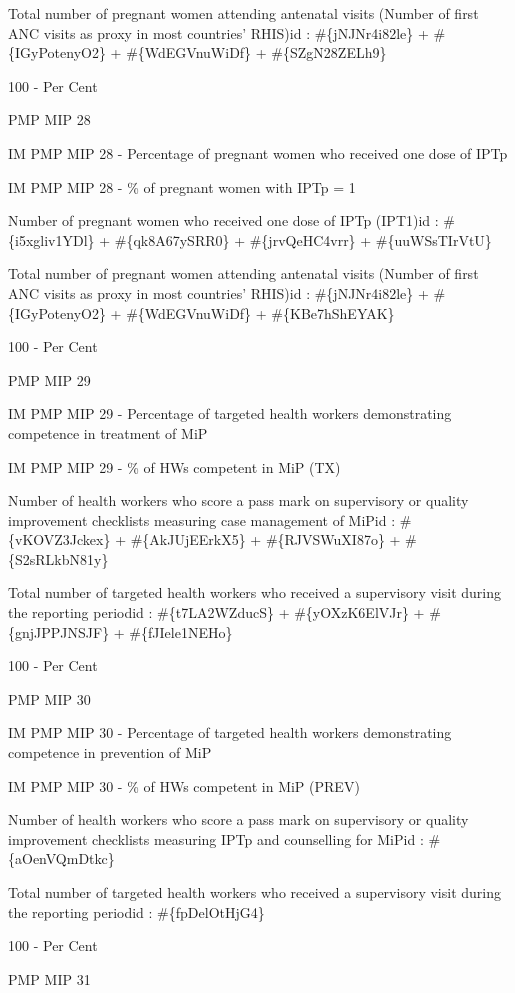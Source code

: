 \documentclass[]{book}
\begin{document}
Total number of pregnant women attending antenatal visits (Number of first ANC visits as proxy in most countries' RHIS)id : \#\{jNJNr4i82le\} + \#\{IGyPotenyO2\} + \#\{WdEGVnuWiDf\} + \#\{SZgN28ZELh9\}

100 - Per Cent

PMP MIP 28

IM PMP MIP 28 - Percentage of pregnant women who received one dose of IPTp

IM PMP MIP 28 - \% of pregnant women with IPTp = 1

Number of pregnant women who received one dose of IPTp (IPT1)id : \#\{i5xgliv1YDl\} + \#\{qk8A67ySRR0\} + \#\{jrvQeHC4vrr\} + \#\{uuWSsTIrVtU\}

Total number of pregnant women attending antenatal visits (Number of first ANC visits as proxy in most countries' RHIS)id : \#\{jNJNr4i82le\} + \#\{IGyPotenyO2\} + \#\{WdEGVnuWiDf\} + \#\{KBe7hShEYAK\}

100 - Per Cent

PMP MIP 29

IM PMP MIP 29 - Percentage of targeted health workers demonstrating competence in treatment of MiP

IM PMP MIP 29 - \% of HWs competent in MiP (TX)

Number of health workers who score a pass mark on supervisory or quality improvement checklists measuring case management of MiPid : \#\{vKOVZ3Jckex\} + \#\{AkJUjEErkX5\} + \#\{RJVSWuXI87o\} + \#\{S2sRLkbN81y\}

Total number of targeted health workers who received a supervisory visit during the reporting periodid : \#\{t7LA2WZducS\} + \#\{yOXzK6ElVJr\} + \#\{gnjJPPJNSJF\} + \#\{fJIele1NEHo\}

100 - Per Cent

PMP MIP 30

IM PMP MIP 30 - Percentage of targeted health workers demonstrating competence in prevention of MiP

IM PMP MIP 30 - \% of HWs competent in MiP (PREV)

Number of health workers who score a pass mark on supervisory or quality improvement checklists measuring IPTp and counselling for MiPid : \#\{aOenVQmDtkc\}

Total number of targeted health workers who received a supervisory visit during the reporting periodid : \#\{fpDelOtHjG4\}

100 - Per Cent

PMP MIP 31
\end{document}
